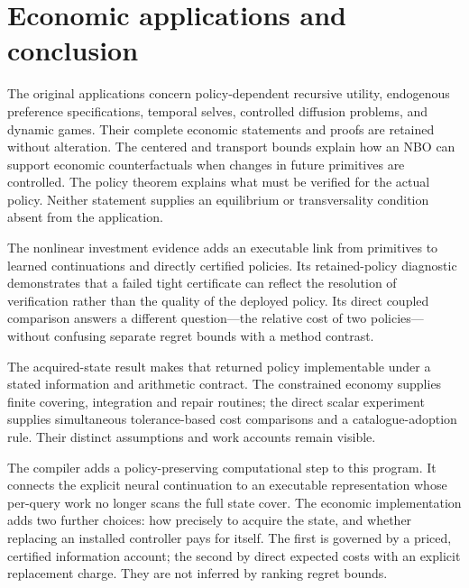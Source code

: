 \documentclass[ecta,nameyear,draft]{econsocart}
\begin{document}












\section{Economic applications and conclusion}\label{sec:conclusion}
The original applications concern policy-dependent recursive utility, endogenous preference specifications, temporal selves, controlled diffusion problems, and dynamic games. Their complete economic statements and proofs are retained without alteration. The centered and transport bounds explain how an NBO can support economic counterfactuals when changes in future primitives are controlled. The policy theorem explains what must be verified for the actual policy. Neither statement supplies an equilibrium or transversality condition absent from the application.

The nonlinear investment evidence adds an executable link from primitives to learned continuations and directly certified policies. Its retained-policy diagnostic demonstrates that a failed tight certificate can reflect the resolution of verification rather than the quality of the deployed policy. Its direct coupled comparison answers a different question---the relative cost of two policies---without confusing separate regret bounds with a method contrast.

The acquired-state result makes that returned policy implementable under a stated information and arithmetic contract. The constrained economy supplies finite covering, integration and repair routines; the direct scalar experiment supplies simultaneous tolerance-based cost comparisons and a catalogue-adoption rule. Their distinct assumptions and work accounts remain visible.

The compiler adds a policy-preserving computational step to this program. It connects the explicit neural continuation to an executable representation whose per-query work no longer scans the full state cover. The economic implementation adds two further choices: how precisely to acquire the state, and whether replacing an installed controller pays for itself. The first is governed by a priced, certified information account; the second by direct expected costs with an explicit replacement charge. They are not inferred by ranking regret bounds.
\end{document}
